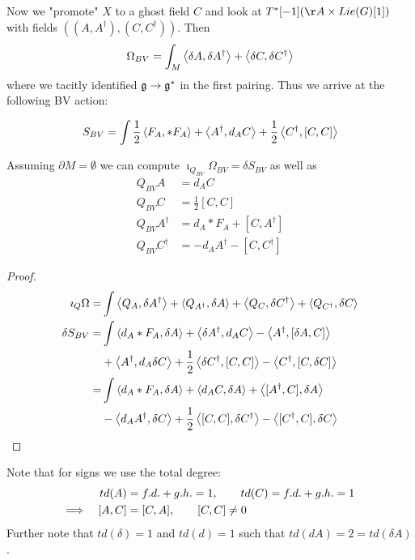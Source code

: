 \begin{example}
  Now we "promote" $X$ to a ghost field $C$ and look at $T^*[-1](\AA \times Lie(G)[1])$ with fields $((A,A^\dagger), (C, C^\dagger))$. Then
  \begin{equation}
    \Omega_{BV} = \int_M \left\langle \delta A , \delta A^\dagger \right\rangle + \left\langle \delta C , \delta C^\dagger \right\rangle
  \end{equation}
  where we tacitly identified $\mathfrak{g} \rightarrow \mathfrak{g}^*$ in the first pairing. Thus we arrive at the following BV action:

  \begin{equation}
    S_{BV} = \int \frac{1}{2} \left\langle F_A , *F_A \right\rangle + \left\langle A^\dagger , d_A C \right\rangle + \frac{1}{2} \left\langle C^\dagger , [C,C] \right\rangle
  \end{equation}

  Assuming $\partial M = \emptyset$ we can compute $\imath_{Q_{BV}} \Omega_{BV} = \delta S_{BV}$ as well as
  \begin{align}
    Q_{BV} A &= d_A C\\
    Q_{BV} C &= \frac{1}{2} [C,C] \\
    Q_{BV} A^\dagger &= d_A *F_A + [C,A^\dagger] \\
    Q_{BV} C^\dagger &= -d_A A^\dagger - [C,C^\dagger]
  \end{align}
  \begin{proof}
    \begin{align}
      \imath_Q \Omega = &\int \left\langle Q_A , \delta A^\dagger \right\rangle + \left\langle Q_{A^\dagger} , \delta A \right\rangle + \left\langle Q_C , \delta C^\dagger \right\rangle + \left\langle Q_{C^\dagger} , \delta C \right\rangle \\
      \delta S_{BV} = &\int \left\langle d_A * F_A , \delta A \right\rangle + \left\langle \delta A^\dagger , d_A C \right\rangle - \left\langle A^\dagger , [\delta A, C] \right\rangle\\
      &+ \left\langle A^\dagger , d_A \delta C \right\rangle + \frac{1}{2} \left\langle \delta C^\dagger , [C,C] \right\rangle - \left\langle C^\dagger , [C, \delta C] \right\rangle \\
      = &\int \left\langle d_A * F_A , \delta A \right\rangle + \left\langle d_A C , \delta A \right\rangle + \left\langle [A^\dagger,C] , \delta A \right\rangle\\
      &- \left\langle d_A A^\dagger , \delta C \right\rangle + \frac{1}{2} \left\langle [C,C] , \delta C^\dagger \right\rangle - \left\langle [C^\dagger, C] , \delta C \right\rangle \\
    \end{align}
  \end{proof}

  \begin{rem}
    Note that for signs we use the total degree:
    \begin{align}
      td(A) &= f.d. + g.h. = 1, \quad \quad td(C) = f.d. + g.h. = 1\\
      \Longrightarrow \quad [A,C] &= [C,A], \quad \quad [C,C] \neq 0
    \end{align}
    Further note that $td(\delta) = 1$ and $td(d) = 1$ such that $td(dA) = 2 = td(\delta A)$.
  \end{rem}


\end{example}
